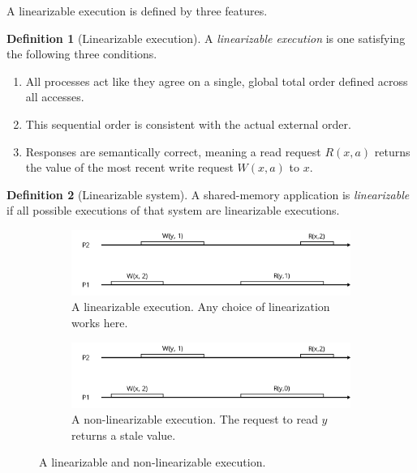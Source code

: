 \documentclass[]             %
{NASA}                       %
\theoremstyle{definition}
\newtheorem{definition}{Definition}[section]
\providecommand{\tightlist}{%
  \setlength{\itemsep}{0pt}\setlength{\parskip}{0pt}}
\begin{document}
A linearizable execution is defined by three features.

\begin{definition}[Linearizable execution]
  A \emph{linearizable execution} is one satisfying the following three conditions.
\begin{enumerate}
  \tightlist
\item
  All processes act like they agree on a single, global total order
  defined across all accesses.
\item
  This sequential order is consistent with the actual external order.
\item
  Responses are semantically correct, meaning a read request \(R(x, a)\)
  returns the value of the most recent write request \(W(x, a)\) to
  \(x\).
\end{enumerate}
\end{definition}

\begin{definition}[Linearizable system]
  A shared-memory application is \emph{linearizable} if all possible
  executions of that system are linearizable executions.
\end{definition}

\begin{figure}[p]
  \begin{subfigure}[a]{1\textwidth} \center
    \includegraphics[scale=0.4]{images/linear1.png} \caption{A
      linearizable execution. Any choice of linearization works here.}
    \label{fig:linear_example11} \end{subfigure}
  \begin{subfigure}[b]{1\textwidth} \center
    \includegraphics[scale=0.4]{images/nonlinear0.png} \caption{A
      non-linearizable execution. The request to read $y$ returns a
      stale value. } \label{fig:linear_example12} \end{subfigure}
  \caption{A linearizable and non-linearizable execution.}
  \label{fig:linear_example1} \end{figure}
\end{document}
